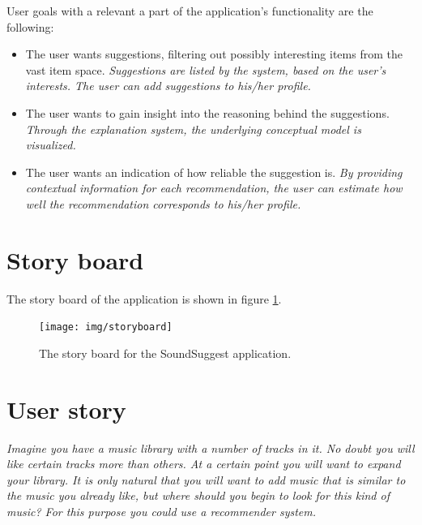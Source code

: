 User goals with a relevant a part of the application's functionality are the following:

\begin{itemize}
	\item The user wants suggestions, filtering out possibly interesting items from the vast item space. \textit{Suggestions are listed by the system, based on the user's interests. The user can add suggestions to his/her profile.}
	\item The user wants to gain insight into the reasoning behind the suggestions. \textit{Through the explanation system, the underlying conceptual model is visualized.}
	\item The user wants an indication of how reliable the suggestion is. \textit{By providing contextual information for each recommendation, the user can estimate how well the recommendation corresponds to his/her profile.}
\end{itemize}



\section{Story board}

The story board of the application is shown in figure \ref{figure:storyboard}.

\begin{figure}
  \begin{center}
  \texttt{[image: img/storyboard]}
	\end{center}
  \caption{The story board for the SoundSuggest application.}
  \label{figure:storyboard}
\end{figure}



\section{User story}

\textit{Imagine you have a music library with a number of tracks in it. No doubt you will like certain tracks more than others. At a certain point you will want to expand your library. It is only natural that you will want to add music that is similar to the music you already like, but where should you begin to look for this kind of music? For this purpose you could use a recommender system.}

